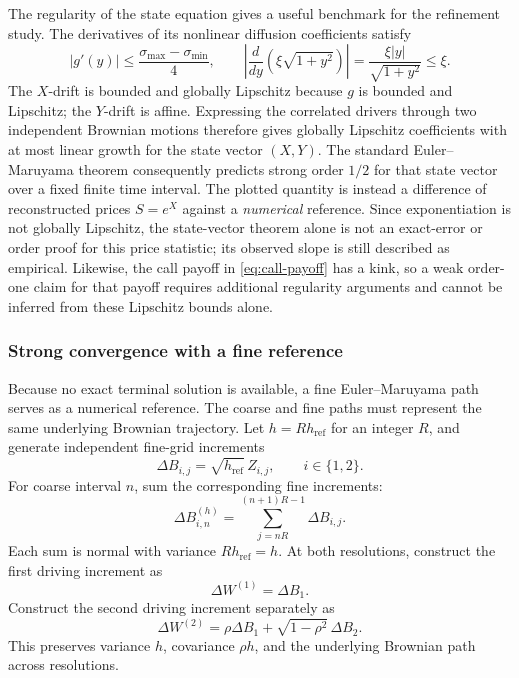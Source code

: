 The regularity of the state equation gives a useful benchmark for the
refinement study.  The derivatives of its nonlinear diffusion coefficients
satisfy
\begin{equation}
    |g'(y)|\leq\frac{\sigma_{\max}-\sigma_{\min}}{4},
    \qquad
    \left|\frac{d}{dy}\left(\xi\sqrt{1+y^2}\right)\right|
      =\frac{\xi|y|}{\sqrt{1+y^2}}\leq\xi.
    \label{eq:nonaffine-lipschitz-bounds}
\end{equation}
The $X$-drift is bounded and globally Lipschitz because $g$ is bounded and
Lipschitz; the $Y$-drift is affine.  Expressing the correlated drivers through
two independent Brownian motions therefore gives globally Lipschitz
coefficients with at most linear growth for the state vector $(X,Y)$.
The standard Euler--Maruyama theorem consequently predicts strong order
$1/2$ for that state vector over a fixed finite time interval.  The plotted
quantity is instead a difference of reconstructed prices $S=e^X$ against a
\emph{numerical} reference.  Since exponentiation is not globally Lipschitz,
the state-vector theorem alone is not an exact-error or order proof for this
price statistic; its observed slope is still described as empirical.
Likewise, the call payoff in \eqref{eq:call-payoff} has a kink, so a weak
order-one claim for that payoff requires additional regularity arguments and
cannot be inferred from these Lipschitz bounds alone.

\subsubsection{Strong convergence with a fine reference}
\label{subsubsec:nested-coupling}

Because no exact terminal solution is available, a fine Euler--Maruyama path
serves as a numerical reference.  The coarse and fine paths must represent the
same underlying Brownian trajectory.  Let $h=Rh_{\mathrm{ref}}$ for an integer
$R$, and generate independent fine-grid increments
\begin{equation}
    \Delta B_{i,j}=\sqrt{h_{\mathrm{ref}}}\,Z_{i,j},
    \qquad i\in\{1,2\}.
    \label{eq:fine-independent-increments}
\end{equation}
For coarse interval $n$, sum the corresponding fine increments:
\begin{equation}
    \Delta B_{i,n}^{(h)}
       =\sum_{j=nR}^{(n+1)R-1}\Delta B_{i,j}.
    \label{eq:coarse-independent-sum}
\end{equation}
Each sum is normal with variance $Rh_{\mathrm{ref}}=h$.  At both resolutions,
construct the first driving increment as
\begin{equation}
    \Delta W^{(1)}=\Delta B_1.
    \label{eq:nested-w1}
\end{equation}
Construct the second driving increment separately as
\begin{equation}
    \Delta W^{(2)}
      =\rho\Delta B_1+\sqrt{1-\rho^2}\,\Delta B_2.
    \label{eq:correlation-from-independent-streams}
\end{equation}
This preserves variance $h$, covariance $\rho h$, and the underlying Brownian
path across resolutions.

